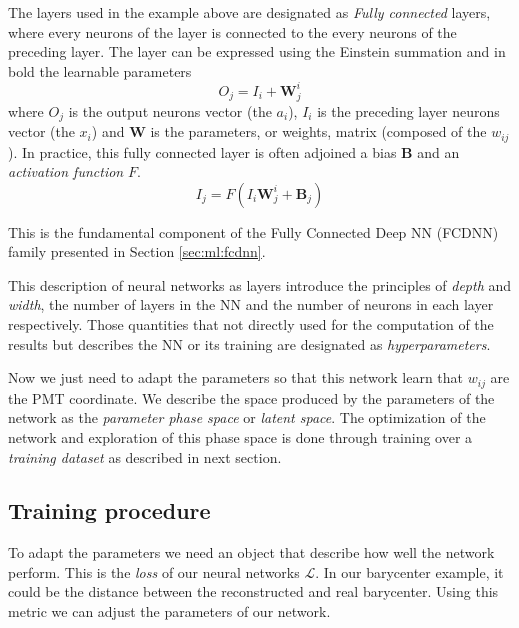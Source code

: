 \documentclass[../main.tex]{subfiles}
\begin{document}
The layers used in the example above are designated as \textit{Fully connected} layers, where every neurons of the layer is connected to the every neurons of the preceding layer. The layer can be expressed using the Einstein summation and in bold the learnable parameters
\begin{equation}
  \label{eq:ml:fully-connected-simple}
  O_{j} = I_{i} + \bm{W}_{j}^{i}
\end{equation}
where $O_{j}$ is the output neurons vector (the $a_i$), $I_{i}$ is the preceding layer neurons vector (the $x_i$) and $\bm{W}$ is the parameters, or weights, matrix (composed of the $w_{ij}$).
In practice, this fully connected layer is often adjoined a bias $\bm{B}$ and an \textit{activation function} $F$.
\begin{equation}
  \label{eq:ml:fully-connected}
  I_{j} = F(I_{i} \bm{W}_{j}^{i} + \bm{B}_j)
\end{equation}

This is the fundamental component of the Fully Connected Deep NN (FCDNN) family presented in Section \ref{sec:ml:fcdnn}.

This description of neural networks as layers introduce the principles of \textit{depth} and \textit{width}, the number of layers in the NN and the number of neurons in each layer respectively. Those quantities that not directly used for the computation of the results but describes the NN or its training are designated as \textit{hyperparameters}.

Now we just need to adapt the parameters so that this network learn that $w_{ij}$ are the PMT coordinate. We describe the space produced by the parameters of the network as the \textit{parameter phase space} or \textit{latent space}. The optimization of the network and exploration of this phase space is done through training over a \textit{training dataset} as described in next section.

\subsection{Training procedure}
\label{sec:ml:train}

To adapt the parameters we need an object that describe how well the network perform. This is the \textit{loss} of our neural networks $\mathcal{L}$. In our barycenter example, it could be the distance between the reconstructed and real barycenter. Using this metric we can adjust the parameters of our network.
\end{document}

